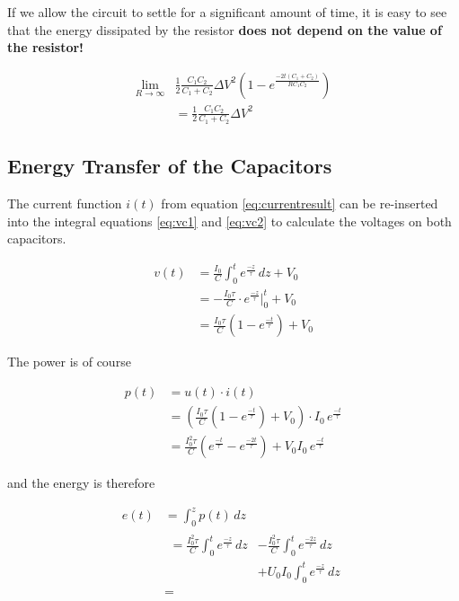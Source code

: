 If we allow the circuit to settle for a significant amount of time, it is easy
to see that  the  energy dissipated by the resistor \textbf{does not depend on
the value of the resistor!}

\begin{align}
    \lim_{R\to\infty} & \frac{1}{2} \frac{C_1C_2}{C_1+C_2} {\Delta V}^2 \left(1 - e^{\frac{-2t\left(C_1+C_2\right)}{RC_1C_2}}\right) \\
    &= \frac{1}{2} \frac{C_1C_2}{C_1+C_2} {\Delta V}^2 \label{eq:finalresult}
\end{align}

\subsection{Energy Transfer of the Capacitors}

The  current function  $i(t)$  from  equation  \ref{eq:currentresult}  can  be
re-inserted  into  the integral equations  \ref{eq:vc1}  and  \ref{eq:vc2}  to
calculate the voltages on both capacitors.

\begin{align}
    v(t) &= \frac{I_0}{C} \int_0^t e^\frac{-z}{\tau}\,dz + V_0\\
         &= -\frac{I_0\tau}{C} \cdot e^\frac{-z}{\tau} \bigg|_0^t + V_0 \\
         &= \frac{I_0\tau}{C}\left(1-e^\frac{-t}{\tau}\right) + V_0
\end{align}

The power is of course

\begin{align}
    p(t) &= u(t)\cdot i(t) \\
         &= \left( \frac{I_0\tau}{C}\left(1 - e^\frac{-t}{\tau}\right) + V_0 \right) \cdot I_0\,e^\frac{-t}{\tau} \\
         &= \frac{I_0^2\tau}{C}\left(e^\frac{-t}{\tau}-e^\frac{-2t}{\tau}\right) + V_0I_0\,e^\frac{-t}{\tau}
\end{align}

and the energy is therefore

\begin{align}
    e(t) &= \int_0^z p(t)\,dz \\
         & \begin{aligned}
            = \frac{I_0^2\tau}{C}\int_0^t e^\frac{-z}{\tau}\,dz &- \frac{I_0^2\tau}{C}\int_0^t e^\frac{-2z}{\tau}\,dz \\
                                                               &+ U_0I_0\int_0^t e^\frac{-z}{\tau}\,dz
        \end{aligned} \\
         &= 
\end{align}

